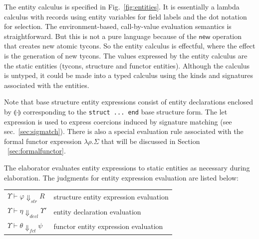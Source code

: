 \documentclass[9pt,nocopyrightspace, fleqn]{sigplanconf}
\begin{document}


The entity calculus is specified in Fig.~\ref{fig:entities}.  It is
essentially a lambda calculus with records using entity variables for
field labels and the dot notation for selection. The
environment-based, call-by-value
evaluation semantics is straightforward.  But this is not a pure
language because of the $\mathsf{new}$ operation that creates new
atomic tycons. So the entity calculus is effectful, where the effect
is the generation of new tycons.  The values expressed by the 
entity calculus are the static entities (tycons, structure and functor
entities).  Although the calculus is untyped, it could be made into
a typed calculus using the kinds and signatures associated with the
entities.

Note that base structure entity expressions consist of entity
declarations enclosed by $\llparenthesis\cdot\rrparenthesis$
corresponding to the \lstinline{struct ... end} base structure form.
The let expression is used to express coercions induced by signature
matching (see sec.~\ref{sec:sigmatch}).  There is also a special
evaluation rule associated with the formal functor expression
$\lambda\rho.\Sigma$ that will be discussed in Section
~\ref{sec:formalfunctor}.

The elaborator evaluates entity expressions to static
entities as necessary during elaboration. The judgments for  entity
expression evaluation are listed below:

\vspace{1ex}
\begin{tabular}{ll}
	$\Upsilon\vdash\varphi \Downarrow_{str} R$ & structure entity expression evaluation \\
	$\Upsilon\vdash\eta \Downarrow_{decl} \Upsilon'$ & entity declaration evaluation \\
	$\Upsilon\vdash\theta \Downarrow_{fct} \psi$ & functor entity expression evaluation
\end{tabular}
\vspace{1ex}


% 
% 
% 
\end{document}
